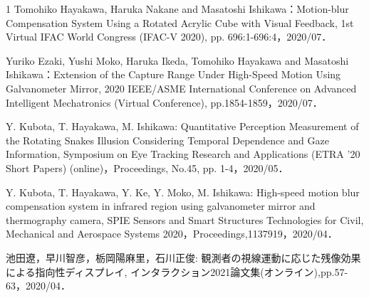 \begin{査読付}{1}
Tomohiko Hayakawa, Haruka Nakane and Masatoshi Ishikawa：Motion-blur Compensation System Using a Rotated Acrylic Cube with Visual Feedback, 1st Virtual IFAC World Congress (IFAC-V 2020), pp. 696:1-696:4，2020/07．

Yuriko Ezaki, Yushi Moko, Haruka Ikeda, Tomohiko Hayakawa and Masatoshi Ishikawa：Extension of the Capture Range Under High-Speed Motion Using Galvanometer Mirror, 2020 IEEE/ASME International Conference on Advanced Intelligent Mechatronics (Virtual Conference), pp.1854-1859，2020/07．

Y. Kubota, T. Hayakawa, M. Ishikawa: Quantitative Perception Measurement of the Rotating Snakes Illusion Considering Temporal Dependence and Gaze Information, Symposium on Eye Tracking Research and Applications (ETRA '20 Short Papers) (online)，Proceedings, No.45, pp. 1-4，2020/05．

Y. Kubota, T. Hayakawa, Y. Ke, Y. Moko, M. Ishikawa: High-speed motion blur compensation system in infrared region using galvanometer mirror and thermography camera, SPIE Sensors and Smart Structures Technologies for Civil, Mechanical and Aerospace Systems 2020，Proceedings,1137919，2020/04．

池田遼，早川智彦，栃岡陽麻里，石川正俊: 観測者の視線運動に応じた残像効果による指向性ディスプレイ, インタラクション2021論文集(オンライン),pp.57-63，2020/04．

\end{査読付}

